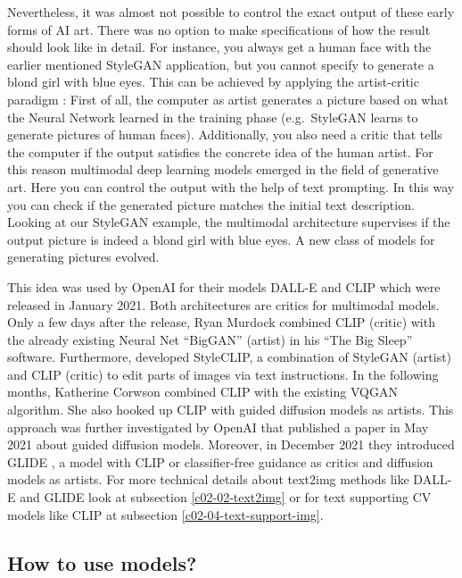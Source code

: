 \documentclass[
]{krantz}
\begin{document}
Nevertheless, it was almost not possible to control the exact output of these early forms of AI art. There was no option to make specifications of how the result should look like in detail. For instance, you always get a human face with the earlier mentioned StyleGAN application, but you cannot specify to generate a blond girl with blue eyes. This can be achieved by applying the artist-critic paradigm \citep{8477754}: First of all, the computer as artist generates a picture based on what the Neural Network learned in the training phase (e.g.~StyleGAN learns to generate pictures of human faces). Additionally, you also need a critic that tells the computer if the output satisfies the concrete idea of the human artist. For this reason multimodal deep learning models emerged in the field of generative art. Here you can control the output with the help of text prompting. In this way you can check if the generated picture matches the initial text description. Looking at our StyleGAN example, the multimodal architecture supervises if the output picture is indeed a blond girl with blue eyes. A new class of models for generating pictures evolved.

This idea was used by OpenAI for their models DALL-E \citep{DALLE} and CLIP \citep{CLIP} which were released in January 2021. Both architectures are critics for multimodal models. Only a few days after the release, Ryan Murdock combined CLIP (critic) with the already existing Neural Net ``BigGAN'' (artist) in his ``The Big Sleep'' software. Furthermore, \citet{StyleGAN} developed StyleCLIP, a combination of StyleGAN (artist) and CLIP (critic) to edit parts of images via text instructions. In the following months, Katherine Corwson combined CLIP with the existing VQGAN algorithm. She also hooked up CLIP with guided diffusion models as artists. This approach was further investigated by OpenAI that published a paper \citep{DiffusionModels} in May 2021 about guided diffusion models. Moreover, in December 2021 they introduced GLIDE \citep{GLIDE}, a model with CLIP or classifier-free guidance as critics and diffusion models as artists. For more technical details about text2img methods like DALL-E and GLIDE look at subsection \ref{c02-02-text2img}
or for text supporting CV models like CLIP at subsection \ref{c02-04-text-support-img}.

\hypertarget{how-to-use-models}{%
\subsection{How to use models?}\label{how-to-use-models}}
\end{document}
